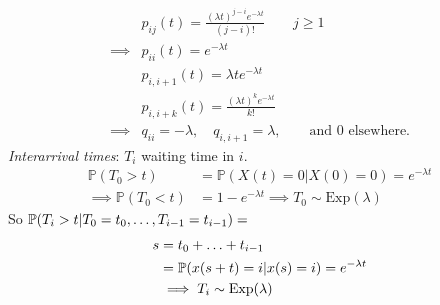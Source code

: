 \documentclass{article}
\begin{document}
	\begin{example}
		\begin{align*}
			&p_{ij}(t)=\frac{(\lambda t)^{j-i}e^{-\lambda t}}{(j-i)!}\qquad j\geqslant 1\\
			\implies &p_{ii}(t)=e^{-\lambda t}\\
			&p_{i,i+1}(t)=\lambda t e^{-\lambda t}\\
			&p_{i,i+k}(t)=\frac{(\lambda t)^{k}e^{-\lambda t}}{k!}\\
			\implies &q_{ii}=-\lambda,\quad q_{i,i+1}=\lambda,\qquad\text{and 0 elsewhere.}
		\end{align*}
		\textit{Interarrival times}: $T_i$ waiting time in $i$.
		\begin{align*}
			\mathbb{P}(T_0 > t) &= \mathbb{P}(X(t) = 0|X(0) = 0) = e^{- \lambda t}\\
			\implies \mathbb{P}(T_0 < t) &= 1-e^{-\lambda t} \implies T_0 \sim \text{Exp}(\lambda)
		\end{align*}
		So $\mathbb{P}(T_i>t|T_0=t_0,\ldots,T_{i-1}=t_{i-1})=$
		\begin{align*}
			s &= t_0+\ldots+t_{i-1}\\
			&=\mathbb{P}(x(s+t)=i|x(s)=i)=e^{-\lambda t}\\
			&\implies T_i\sim\text{Exp}(\lambda)
		\end{align*}
	\end{example}
\end{document}
